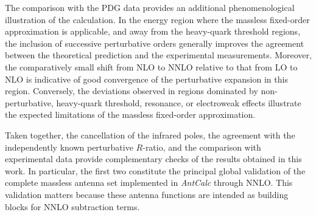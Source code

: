 The comparison with the PDG data provides an additional phenomenological illustration of the
calculation. In the energy region where the massless fixed-order approximation is applicable, and away
from the heavy-quark threshold regions, the inclusion of successive perturbative orders generally
improves the agreement between the theoretical prediction and the experimental measurements. Moreover,
the comparatively small shift from NLO to NNLO relative to that from LO to NLO is indicative of good
convergence of the perturbative expansion in this region. Conversely, the deviations observed in
regions dominated by non-perturbative, heavy-quark threshold, resonance, or electroweak effects
illustrate the expected limitations of the massless fixed-order approximation.

Taken together, the cancellation of the infrared poles, the agreement with the independently known
perturbative $R$-ratio, and the comparison with experimental data provide complementary checks of the
results obtained in this work. In particular, the first two constitute the principal global validation
of the complete massless antenna set implemented in \textit{AntCalc} through NNLO. This validation matters because these antenna functions are intended as building blocks for NNLO subtraction terms.
